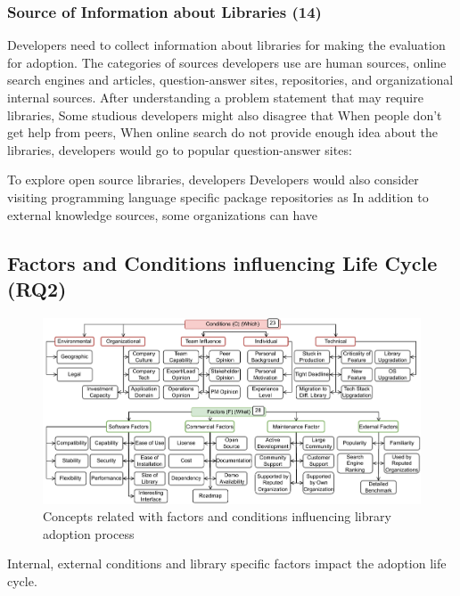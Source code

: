 \subsubsection{Source of Information about Libraries (14)} Developers need to collect information about libraries for making the evaluation for adoption. The categories of sources developers use are human sources, online search engines and articles, question-answer sites, repositories, and organizational internal sources. After understanding a problem statement that may require libraries,  Some studious developers might also disagree that  When people don't get help from peers,  When online search do not provide enough idea about the libraries, developers would go to popular question-answer sites: 

To explore open source libraries, developers  Developers would also consider visiting programming language specific package repositories as  In addition to external knowledge sources, some organizations can have 

\subsection{Factors and Conditions influencing Life Cycle (RQ2)}
\begin{figure}
    \centering
    \includegraphics[scale=0.85]{images/conditions.pdf}
    \caption{Concepts related with factors and conditions influencing library adoption process}
    \label{fig:conditions}
\end{figure}
Internal, external conditions and library specific factors impact the adoption life cycle.

